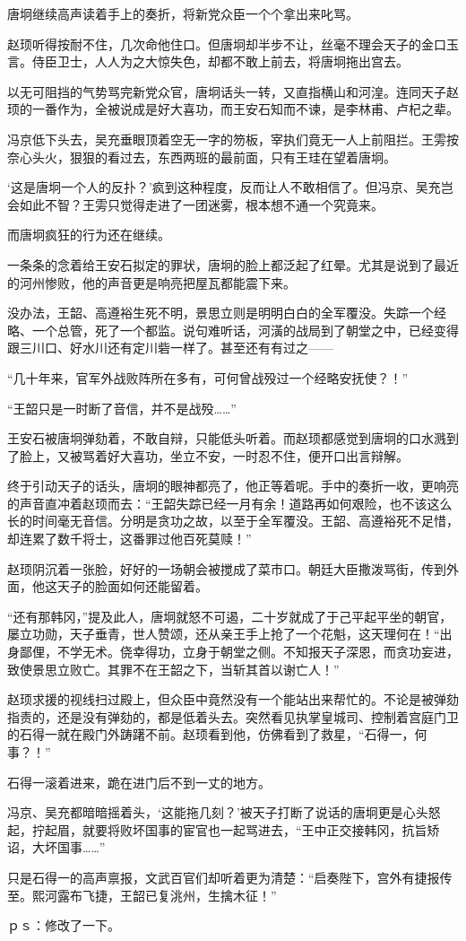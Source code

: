唐坰继续高声读着手上的奏折，将新党众臣一个个拿出来叱骂。

赵顼听得按耐不住，几次命他住口。但唐坰却半步不让，丝毫不理会天子的金口玉言。侍臣卫士，人人为之大惊失色，却都不敢上前去，将唐坰拖出宫去。

以无可阻挡的气势骂完新党众官，唐坰话头一转，又直指横山和河湟。连同天子赵顼的一番作为，全被说成是好大喜功，而王安石知而不谏，是李林甫、卢杞之辈。

冯京低下头去，吴充垂眼顶着空无一字的笏板，宰执们竟无一人上前阻拦。王雱按奈心头火，狠狠的看过去，东西两班的最前面，只有王珪在望着唐坰。

‘这是唐坰一个人的反扑？’疯到这种程度，反而让人不敢相信了。但冯京、吴充岂会如此不智？王雱只觉得走进了一团迷雾，根本想不通一个究竟来。

而唐坰疯狂的行为还在继续。

一条条的念着给王安石拟定的罪状，唐坰的脸上都泛起了红晕。尤其是说到了最近的河州惨败，他的声音更是响亮把屋瓦都能震下来。

没办法，王韶、高遵裕生死不明，景思立则是明明白白的全军覆没。失踪一个经略、一个总管，死了一个都监。说句难听话，河潢的战局到了朝堂之中，已经变得跟三川口、好水川还有定川砦一样了。甚至还有有过之——

“几十年来，官军外战败阵所在多有，可何曾战殁过一个经略安抚使？！”

“王韶只是一时断了音信，并不是战殁……”

王安石被唐坰弹劾着，不敢自辩，只能低头听着。而赵顼都感觉到唐坰的口水溅到了脸上，又被骂着好大喜功，坐立不安，一时忍不住，便开口出言辩解。

终于引动天子的话头，唐坰的眼神都亮了，他正等着呢。手中的奏折一收，更响亮的声音直冲着赵顼而去：“王韶失踪已经一月有余！道路再如何艰险，也不该这么长的时间毫无音信。分明是贪功之故，以至于全军覆没。王韶、高遵裕死不足惜，却连累了数千将士，这番罪过他百死莫赎！”

赵顼阴沉着一张脸，好好的一场朝会被搅成了菜市口。朝廷大臣撒泼骂街，传到外面，他这天子的脸面如何还能留着。

“还有那韩冈，”提及此人，唐坰就怒不可遏，二十岁就成了于己平起平坐的朝官，屡立功勋，天子垂青，世人赞颂，还从亲王手上抢了一个花魁，这天理何在！“出身鄙俚，不学无术。侥幸得功，立身于朝堂之侧。不知报天子深恩，而贪功妄进，致使景思立败亡。其罪不在王韶之下，当斩其首以谢亡人！”

赵顼求援的视线扫过殿上，但众臣中竟然没有一个能站出来帮忙的。不论是被弹劾指责的，还是没有弹劾的，都是低着头去。突然看见执掌皇城司、控制着宫庭门卫的石得一就在殿门外踌躇不前。赵顼看到他，仿佛看到了救星，“石得一，何事？！”

石得一滚着进来，跪在进门后不到一丈的地方。

冯京、吴充都暗暗摇着头，‘这能拖几刻？’被天子打断了说话的唐坰更是心头怒起，拧起眉，就要将败坏国事的宦官也一起骂进去，“王中正交接韩冈，抗旨矫诏，大坏国事……”

只是石得一的高声禀报，文武百官们却听着更为清楚：“启奏陛下，宫外有捷报传至。熙河露布飞捷，王韶已复洮州，生擒木征！”

ｐｓ：修改了一下。

